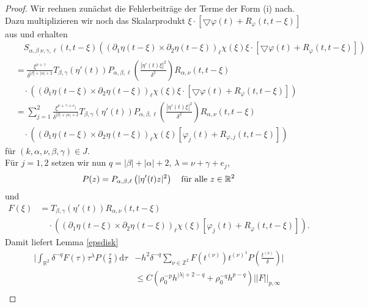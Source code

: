 \documentclass[12pt,a4paper]{scrartcl}
\newcommand{\dd}{\mathrm{d}}
\numberwithin{equation}{section}
\newcommand{\R}{\mathbb{R}} %
\newcommand{\Z}{\mathbb{Z}} %
\newcommand{\grad}{\bigtriangledown}
\newcommand{\fa}{\text{\quad für alle }}
\begin{document}
\begin{proof}
Wir rechnen zunächst die Fehlerbeiträge der Terme der Form (i) nach.
Dazu multiplizieren wir noch das Skalarprodukt $\xi \cdot \left[\grad\varphi(t) + R_\varphi(t,t-\xi) \right]$ aus und erhalten
\begin{align*}
&\quad S_{\alpha,\beta_,\nu,\gamma,\ell}(t,t-\xi)\left((\partial_1 \eta (t-\xi) \times \partial_2 \eta(t-\xi))_\ell\chi(\xi)\xi \cdot\left[ \grad\varphi(t) + R_\varphi(t,t-\xi) \right] \right) \\
&=\frac{\xi^{\nu+\gamma}}{\delta^{|\beta|+|\alpha|+2}}T_{\beta,\gamma}(\eta'(t)) P_{\alpha,\beta,\ell} \left(\frac{| \eta'(t)\xi|^2}{\delta^2}\right)R_{\alpha,\nu}(t,t-\xi) \\
& \quad \cdot \left((\partial_1 \eta (t-\xi) \times \partial_2 \eta(t-\xi))_\ell\chi(\xi)\xi \cdot \left[\grad\varphi(t) + R_\varphi(t,t-\xi) \right] \right) \\
&=\sum_{j=1}^2 \frac{\xi^{\nu+\gamma+e_j}}{\delta^{|\beta|+|\alpha|+2}}T_{\beta,\gamma}(\eta'(t)) P_{\alpha,\beta,\ell} \left(\frac{| \eta'(t)\xi|^2}{\delta^2}\right)R_{\alpha,\nu}(t,t-\xi) \\
& \quad\cdot \left((\partial_1 \eta (t-\xi) \times \partial_2 \eta(t-\xi))_\ell\chi(\xi)\left[\varphi_j(t) + R_{\varphi,j}(t,t-\xi) \right] \right)
\end{align*}
für $(k,\alpha,\nu,\beta,\gamma) \in J$.  \\
   Für $j=1,2$ setzen wir nun $q=|\beta|+|\alpha|+2$, $\lambda = \nu + \gamma + e_j $, 
\[
P(z)= P_{\alpha,\beta,\ell} \left(|\eta'(t)z|^2 \right) \fa z \in \R^2
\]
und 
\begin{align*}
F(\xi) &= T_{\beta,\gamma}(\eta'(t)) R_{\alpha,\nu}(t,t-\xi) \\
& \quad \cdot \left((\partial_1 \eta (t-\xi) \times \partial_2 \eta(t-\xi))_\ell\chi(\xi)\left[ \varphi_j(t) + R_\varphi(t,t-\xi) \right] \right).
\end{align*}
Damit liefert Lemma \ref{epsdisk}
\begin{align*}
\bigg|\int_{\R^2} \delta^{-q}F(\tau)\tau^\lambda P\left(\frac{\tau}{\delta}\right) \dd \tau &- h^2 \delta^{-q} \sum_{\nu \in \Z^2}F(t^{(\nu)})t^{(\nu)^\lambda} P\left(\frac{t^{(\nu)}}{\delta}\right)\bigg| \\
&\leq C( \rho_0^{-p}h^{|\lambda|+2-q}+\rho_0^{-q}h^{p-q})||F||_{p,\infty} \\

\end{align*}
\end{proof}
\end{document}
